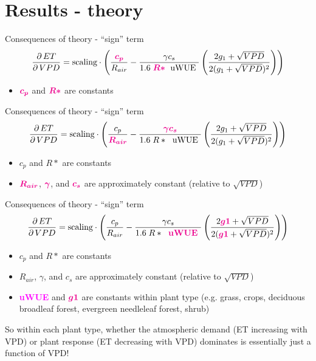 \documentclass[aspectratio=169]{beamer}
\begin{document}
\section{Results - theory}
\begin{frame}{Consequences of theory - ``sign'' term}
  \[\frac{\partial \, ET}{\partial \, VPD} = \text{scaling} \cdot \left(\frac{\textcolor{magenta}{\boldsymbol{ c_p}}}{R_{air}} - \frac{\gamma c_s }{1.6 \; \textcolor{magenta}{\boldsymbol{R*}}\; \text{ uWUE }} \left( \frac{2 g_1 + \sqrt{VPD}}{2 (g_1 + \sqrt{VPD})^2}\right) \right)\]
  \begin{itemize}
  \item $\textcolor{magenta}{\boldsymbol{c_p}}$ and $\textcolor{magenta}{\boldsymbol{R*}}$ are constants
  \end{itemize}
\end{frame}

\begin{frame}{Consequences of theory - ``sign'' term}
  \[\frac{\partial \, ET}{\partial \, VPD} = \text{scaling} \cdot \left(\frac{ c_p}{\textcolor{magenta}{\boldsymbol{R_{air}}}} - \frac{\textcolor{magenta}{\boldsymbol{\gamma}} \textcolor{magenta}{\boldsymbol{c_s}} }{1.6 \; R*\; \text{ uWUE }} \left( \frac{2 g_1 + \sqrt{VPD}}{2 (g_1 + \sqrt{VPD})^2}\right) \right)\]
  \begin{itemize}
  \item $c_p$ and $R*$ are constants
  \item $\textcolor{magenta}{\boldsymbol{R_{air}}}$, $\textcolor{magenta}{\boldsymbol{\gamma}}$, and $\textcolor{magenta}{\boldsymbol{c_s}}$ are approximately constant (relative to $\sqrt{VPD}$)
  \end{itemize}
\end{frame}

\begin{frame}{Consequences of theory - ``sign'' term}
  \[\frac{\partial \, ET}{\partial \, VPD} = \text{scaling} \cdot \left(\frac{ c_p}{R_{air}} - \frac{\gamma c_s }{1.6 \; R*\; \text{ \textcolor{magenta}{\textbf{uWUE }}}} \left( \frac{2 \textcolor{magenta}{\boldsymbol{g1}} + \sqrt{VPD}}{2 (\textcolor{magenta}{\boldsymbol{g1}} + \sqrt{VPD})^2}\right) \right)\]
  \begin{itemize}
  \item $c_p$ and $R*$ are constants
  \item $R_{air}$, $\gamma$, and $c_s$ are approximately constant (relative to $\sqrt{VPD}$)
  \item \textcolor{magenta}{\textbf{uWUE}} and $\textcolor{magenta}{\boldsymbol{g1}}$ are constants within plant type (e.g. grass, crops, deciduous broadleaf forest, evergreen needleleaf forest, shrub)
  \end{itemize}
  So within each plant type, whether the atmospheric demand (ET increasing with VPD) or plant response (ET decreasing with VPD) dominates is essentially just a function of VPD!
\end{frame}
\end{document}
